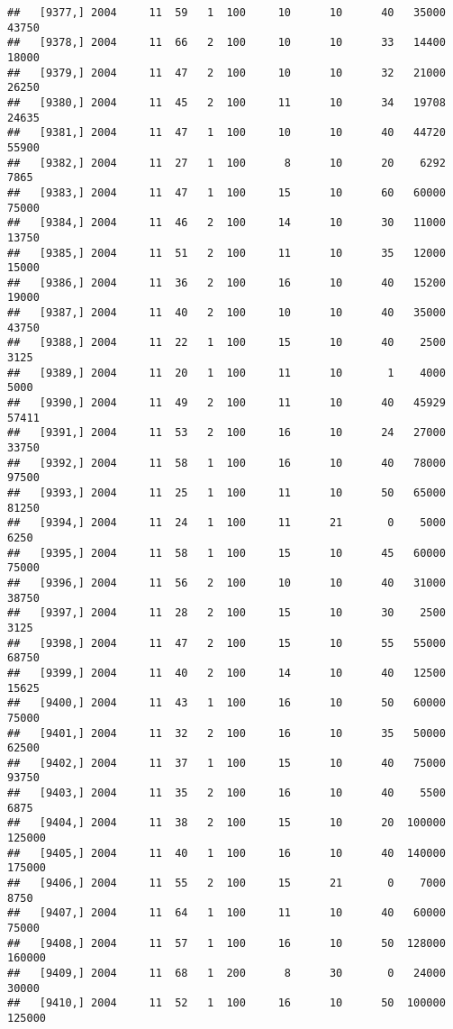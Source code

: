 \documentclass{article}\usepackage[]{graphicx}\usepackage[]{color}
\makeatletter
\newenvironment{kframe}{%
 \def\at@end@of@kframe{}%
 \ifinner\ifhmode%
  \def\at@end@of@kframe{\end{minipage}}%
  \begin{minipage}{\columnwidth}%
 \fi\fi%
 \def\FrameCommand##1{\hskip\@totalleftmargin \hskip-\fboxsep
 \colorbox{shadecolor}{##1}\hskip-\fboxsep
     \hskip-\linewidth \hskip-\@totalleftmargin \hskip\columnwidth}%
 \MakeFramed {\advance\hsize-\width
   \@totalleftmargin\z@ \linewidth\hsize
   \@setminipage}}%
 {\par\unskip\endMakeFramed%
 \at@end@of@kframe}
\newenvironment{knitrout}{}{} %
\makeatother
\begin{document}
\begin{knitrout}
\begin{kframe}
\begin{verbatim}
##   [9377,] 2004     11  59   1  100     10      10      40   35000   43750
##   [9378,] 2004     11  66   2  100     10      10      33   14400   18000
##   [9379,] 2004     11  47   2  100     10      10      32   21000   26250
##   [9380,] 2004     11  45   2  100     11      10      34   19708   24635
##   [9381,] 2004     11  47   1  100     10      10      40   44720   55900
##   [9382,] 2004     11  27   1  100      8      10      20    6292    7865
##   [9383,] 2004     11  47   1  100     15      10      60   60000   75000
##   [9384,] 2004     11  46   2  100     14      10      30   11000   13750
##   [9385,] 2004     11  51   2  100     11      10      35   12000   15000
##   [9386,] 2004     11  36   2  100     16      10      40   15200   19000
##   [9387,] 2004     11  40   2  100     10      10      40   35000   43750
##   [9388,] 2004     11  22   1  100     15      10      40    2500    3125
##   [9389,] 2004     11  20   1  100     11      10       1    4000    5000
##   [9390,] 2004     11  49   2  100     11      10      40   45929   57411
##   [9391,] 2004     11  53   2  100     16      10      24   27000   33750
##   [9392,] 2004     11  58   1  100     16      10      40   78000   97500
##   [9393,] 2004     11  25   1  100     11      10      50   65000   81250
##   [9394,] 2004     11  24   1  100     11      21       0    5000    6250
##   [9395,] 2004     11  58   1  100     15      10      45   60000   75000
##   [9396,] 2004     11  56   2  100     10      10      40   31000   38750
##   [9397,] 2004     11  28   2  100     15      10      30    2500    3125
##   [9398,] 2004     11  47   2  100     15      10      55   55000   68750
##   [9399,] 2004     11  40   2  100     14      10      40   12500   15625
##   [9400,] 2004     11  43   1  100     16      10      50   60000   75000
##   [9401,] 2004     11  32   2  100     16      10      35   50000   62500
##   [9402,] 2004     11  37   1  100     15      10      40   75000   93750
##   [9403,] 2004     11  35   2  100     16      10      40    5500    6875
##   [9404,] 2004     11  38   2  100     15      10      20  100000  125000
##   [9405,] 2004     11  40   1  100     16      10      40  140000  175000
##   [9406,] 2004     11  55   2  100     15      21       0    7000    8750
##   [9407,] 2004     11  64   1  100     11      10      40   60000   75000
##   [9408,] 2004     11  57   1  100     16      10      50  128000  160000
##   [9409,] 2004     11  68   1  200      8      30       0   24000   30000
##   [9410,] 2004     11  52   1  100     16      10      50  100000  125000

\end{verbatim}
\end{kframe}
\end{knitrout}
\end{document}
